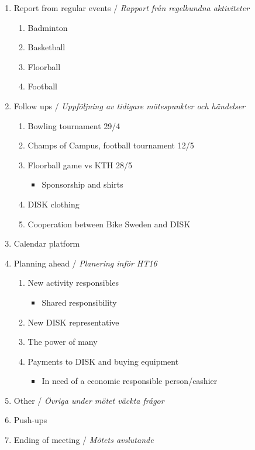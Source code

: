 \documentclass[12pt,a4paper]{article}
\begin{document}
\begin{enumerate}
		\item Report from regular events /  \emph{Rapport från regelbundna aktiviteter}
		\begin{enumerate}
			\item Badminton
			\item Basketball
			\item Floorball
			\item Football
		\end{enumerate}
		\item Follow ups  /  \emph{Uppföljning av tidigare mötespunkter och händelser}
		\begin{enumerate}
			\item Bowling tournament 29/4
			\item Champs of Campus, football tournament 12/5
			\item Floorball game vs KTH 28/5
			\begin{itemize}
			\item Sponsorship and shirts
			\end{itemize}
			\item DISK clothing
			\item Cooperation between Bike Sweden and DISK
		\end{enumerate}
		\item Calendar platform
		\item Planning ahead / \emph{Planering inför HT16}
		\begin{enumerate}
			\item New activity responsibles
			\begin{itemize}
			\item Shared responsibility
			\end{itemize}
			\item New DISK representative
			\item The power of many
			\item Payments to DISK and buying equipment
			\begin{itemize}
			\item In need of a economic responsible person/cashier
			\end{itemize}
		\end{enumerate}
		\item Other / \emph{Övriga under mötet väckta frågor}
		\item Push-ups
		\item Ending of meeting / \emph{Mötets avslutande}
	\end{enumerate}
\end{document}

